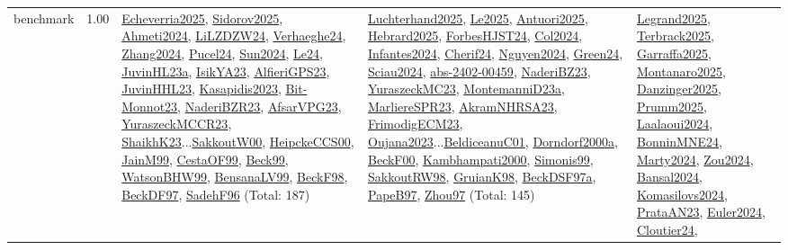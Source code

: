 {\begin{longtable}{p{3cm}r>{\raggedright\arraybackslash}p{6cm}>{\raggedright\arraybackslash}p{6cm}>{\raggedright\arraybackslash}p{8cm}}
\index{benchmark}\index{Benchmarks!benchmark}benchmark &  1.00 & \hyperref[detail:Echeverria2025]{Echeverria2025}, \hyperref[detail:Sidorov2025]{Sidorov2025}, \hyperref[detail:Ahmeti2024]{Ahmeti2024}, \hyperref[detail:LiLZDZW24]{LiLZDZW24}, \hyperref[detail:Verhaeghe24]{Verhaeghe24}, \hyperref[detail:Zhang2024]{Zhang2024}, \hyperref[detail:Pucel24]{Pucel24}, \hyperref[detail:Sun2024]{Sun2024}, \hyperref[detail:Le24]{Le24}, \hyperref[detail:JuvinHL23a]{JuvinHL23a}, \hyperref[detail:IsikYA23]{IsikYA23}, \hyperref[detail:AlfieriGPS23]{AlfieriGPS23}, \hyperref[detail:JuvinHHL23]{JuvinHHL23}, \hyperref[detail:Kasapidis2023]{Kasapidis2023}, \hyperref[detail:Bit-Monnot23]{Bit-Monnot23}, \hyperref[detail:NaderiBZR23]{NaderiBZR23}, \hyperref[detail:AfsarVPG23]{AfsarVPG23}, \hyperref[detail:YuraszeckMCCR23]{YuraszeckMCCR23}, \hyperref[detail:ShaikhK23]{ShaikhK23}...\hyperref[detail:SakkoutW00]{SakkoutW00}, \hyperref[detail:HeipckeCCS00]{HeipckeCCS00}, \hyperref[detail:JainM99]{JainM99}, \hyperref[detail:CestaOF99]{CestaOF99}, \hyperref[detail:Beck99]{Beck99}, \hyperref[detail:WatsonBHW99]{WatsonBHW99}, \hyperref[detail:BensanaLV99]{BensanaLV99}, \hyperref[detail:BeckF98]{BeckF98}, \hyperref[detail:BeckDF97]{BeckDF97}, \hyperref[detail:SadehF96]{SadehF96} (Total: 187) & \hyperref[detail:Luchterhand2025]{Luchterhand2025}, \hyperref[detail:Le2025]{Le2025}, \hyperref[detail:Antuori2025]{Antuori2025}, \hyperref[detail:Hebrard2025]{Hebrard2025}, \hyperref[detail:ForbesHJST24]{ForbesHJST24}, \hyperref[detail:Col2024]{Col2024}, \hyperref[detail:Infantes2024]{Infantes2024}, \hyperref[detail:Cherif24]{Cherif24}, \hyperref[detail:Nguyen2024]{Nguyen2024}, \hyperref[detail:Green24]{Green24}, \hyperref[detail:Sciau2024]{Sciau2024}, \hyperref[detail:abs-2402-00459]{abs-2402-00459}, \hyperref[detail:NaderiBZ23]{NaderiBZ23}, \hyperref[detail:YuraszeckMC23]{YuraszeckMC23}, \hyperref[detail:MontemanniD23a]{MontemanniD23a}, \hyperref[detail:MarliereSPR23]{MarliereSPR23}, \hyperref[detail:AkramNHRSA23]{AkramNHRSA23}, \hyperref[detail:FrimodigECM23]{FrimodigECM23}, \hyperref[detail:Oujana2023]{Oujana2023}...\hyperref[detail:BeldiceanuC01]{BeldiceanuC01}, \hyperref[detail:Dorndorf2000a]{Dorndorf2000a}, \hyperref[detail:BeckF00]{BeckF00}, \hyperref[detail:Kambhampati2000]{Kambhampati2000}, \hyperref[detail:Simonis99]{Simonis99}, \hyperref[detail:SakkoutRW98]{SakkoutRW98}, \hyperref[detail:GruianK98]{GruianK98}, \hyperref[detail:BeckDSF97a]{BeckDSF97a}, \hyperref[detail:PapeB97]{PapeB97}, \hyperref[detail:Zhou97]{Zhou97} (Total: 145) & \hyperref[detail:Legrand2025]{Legrand2025}, \hyperref[detail:Terbrack2025]{Terbrack2025}, \hyperref[detail:Garraffa2025]{Garraffa2025}, \hyperref[detail:Montanaro2025]{Montanaro2025}, \hyperref[detail:Danzinger2025]{Danzinger2025}, \hyperref[detail:Prumm2025]{Prumm2025}, \hyperref[detail:Laalaoui2024]{Laalaoui2024}, \hyperref[detail:BonninMNE24]{BonninMNE24}, \hyperref[detail:Marty2024]{Marty2024}, \hyperref[detail:Zou2024]{Zou2024}, \hyperref[detail:Bansal2024]{Bansal2024}, \hyperref[detail:Komasilovs2024]{Komasilovs2024}, \hyperref[detail:PrataAN23]{PrataAN23}, \hyperref[detail:Euler2024]{Euler2024}, \hyperref[detail:Cloutier24]{Cloutier24}, 
\end{longtable}}
